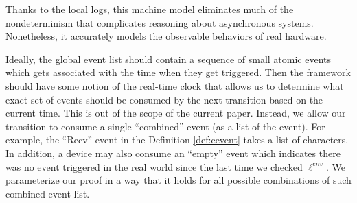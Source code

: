 Thanks to the local logs, this machine model eliminates much of the
nondeterminism that complicates reasoning about asynchronous systems.
Nonetheless, it accurately models the observable behaviors of real hardware.

Ideally, the global event list should contain a sequence of small atomic
events which gets associated with the time when they get triggered. Then the framework
should have some notion of the real-time clock that allows us to determine what exact
set of events should be consumed by the next transition based on the current time.
This is out of the scope of the current paper. Instead, we allow our transition
to consume a single ``combined'' event (as a list of the event). For example, the
``Recv'' event in the Definition \ref{def:eevent} takes a list of characters.
In addition, a device may also consume an ``empty'' event which indicates there
was no event triggered in the real world since the last time we checked $\ell^{env}$.
We parameterize our proof
in a way that it holds for all possible combinations of such combined event
list.




